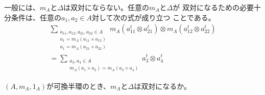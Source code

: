 	一般には、$m_A$と$\Delta$は双対にならない。任意の$m_A$と$\Delta$が
	双対になるための必要十分条件は、任意の$a_1,a_2\in A$対して次の式が成り立つ
	ことである。
	\begin{equation}\begin{split} %
		\sum_{\substack{a_{11},a_{12},a_{21},a_{22}\in A \\ a_1=m_A(a_{11}\times a_{12})\\ a_1=m_A(a_{21}\times a_{22})}}m_A(a_{11}^t\otimes a_{21}^t)\otimes m_A(a_{12}^t\otimes a_{22}^t) \\
		= \sum_{\substack{a_3,a_4\in A \\ m_A(a_1\times a_2)=m_A(a_3\times a_4)}}a_3^t\otimes a_4^t 
	\end{split}\end{equation} %

	\begin{todo}[可換の時]\label{prob:可換の時} %
		$(A,m_A,1_A)$が可換半環のとき、$m_A$と$\Delta$は双対になるか。
	\end{todo} %

